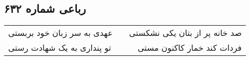 \begin{center}
\section*{رباعی شماره ۶۳۲}
\label{sec:sh632}
\begin{longtable}{l p{0.5cm} r}
عهدی به سر زبان خود بربستی
&&
صد خانه پر از بتان یکی نشکستی
\\
تو پنداری به یک شهادت رستی
&&
فردات کند خمار کاکنون مستی
\\
\end{longtable}
\end{center}
